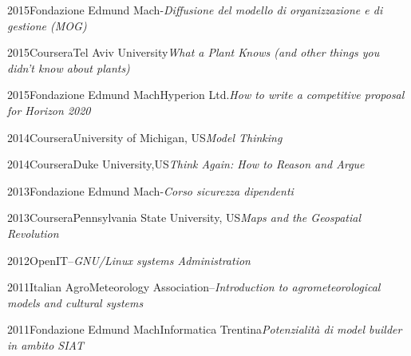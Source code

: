 \documentclass{curriculum}
\begin{document}
    \begin{entrylist}
    \entry
        {2015}{Fondazione Edmund Mach}{-}{\emph{Diffusione del modello di organizzazione e di gestione (MOG)}}
    \end{entrylist}
    
    \begin{entrylist}
    \entry
        {2015}{Coursera}{Tel Aviv University}{\emph{What a Plant Knows (and other things you didn’t know about plants)}}
    \end{entrylist}

    \begin{entrylist}
    \entry
        {2015}{Fondazione Edmund Mach}{Hyperion Ltd.}{\emph{How to write a competitive proposal for Horizon 2020}}
    \end{entrylist}
    
    \begin{entrylist}
    \entry
        {2014}{Coursera}{University of Michigan, US}{\emph{Model Thinking}}
    \end{entrylist}
    \begin{entrylist}
    \entry
        {2014}{Coursera}{Duke University,US}{\emph{Think Again: How to Reason and Argue}}
    \end{entrylist}
    
    \begin{entrylist}
    \entry
        {2013}{Fondazione Edmund Mach}{-}{\emph{Corso sicurezza dipendenti}}
    \end{entrylist}
    
    \begin{entrylist}
    \entry
        {2013}{Coursera}{Pennsylvania State University, US}{\emph{Maps and the Geospatial Revolution}}
    \end{entrylist}
    
    \begin{entrylist}
    \entry
        {2012}{OpenIT}{--}{\emph{GNU/Linux systems Administration}}
    \end{entrylist}
    
    \begin{entrylist}
    \entry
        {2011}{Italian AgroMeteorology Association}{--}{\emph{Introduction to agrometeorological models and cultural systems}}
    \end{entrylist}
    
    \begin{entrylist}
    \entry
        {2011}{Fondazione Edmund Mach}{Informatica Trentina}{\emph{Potenzialità di model builder in ambito SIAT}}
    \end{entrylist}   
    
\end{document}

